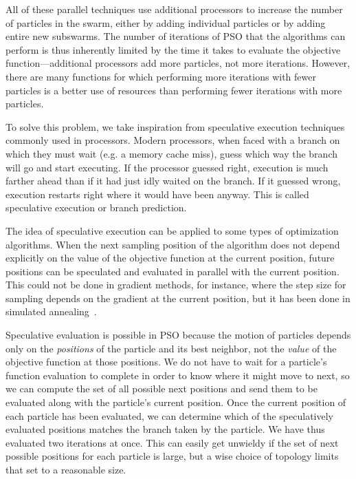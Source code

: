 \documentclass[journal,letterpaper]{IEEEtran}
\begin{document}
All of these parallel techniques use additional processors to increase the
number of particles in the swarm, either by adding individual particles or by
adding entire new subswarms.  The number of iterations of PSO that the
algorithms can perform is thus inherently limited by the time it takes to
evaluate the objective function---additional processors add more particles, not
more iterations.  However, there are many functions for which performing more
iterations with fewer particles is a better use of resources than performing
fewer iterations with more particles.  

To solve this problem, we take inspiration from speculative execution
techniques commonly used in processors.  Modern processors, when faced with a
branch on which they must wait (e.g. a memory cache miss), guess which way the
branch will go and start executing.  If the processor guessed right, execution
is much farther ahead than if it had just idly waited on the branch.  If it
guessed wrong, execution restarts right where it would have been anyway.  This
is called speculative execution or branch prediction.

The idea of speculative execution can be applied to some types of optimization
algorithms.  When the next sampling position of the algorithm does not depend
explicitly on the value of the objective function at the current position,
future positions can be speculated and evaluated in parallel with the current
position.  This could not be done in gradient methods, for instance, where the
step size for sampling depends on the gradient at the current position, but it
has been done in simulated annealing~\cite{witte-tpds91}.

Speculative evaluation is possible in PSO because the motion of particles
depends only on the \emph{positions} of the particle and its best neighbor, not
the \emph{value} of the objective function at those positions.  We do not have
to wait for a particle's function evaluation to complete in order to know where
it might move to next, so we can compute the set of all possible next positions
and send them to be evaluated along with the particle's current position.  Once
the current position of each particle has been evaluated, we can determine
which of the speculatively evaluated positions matches the branch taken by the
particle.  We have thus evaluated two iterations at once.  This can easily get
unwieldy if the set of next possible positions for each particle is large, but
a wise choice of topology limits that set to a reasonable size.
\end{document}
